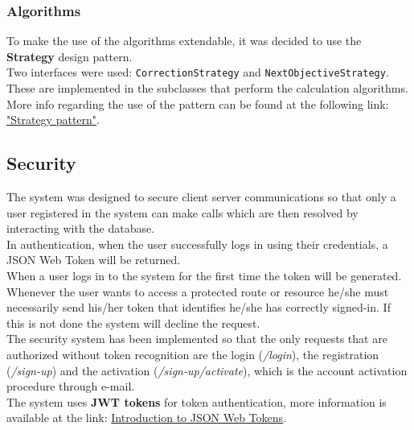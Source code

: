 \subsubsection{Algorithms}
To make the use of the algorithms extendable, it was decided to use the \textbf{Strategy} design pattern.\\
Two interfaces were used: \texttt{CorrectionStrategy} and \texttt{NextObjectiveStrategy}. These are implemented in the subclasses that perform the calculation algorithms.\\
More info regarding the use of the pattern can be found at the following link: \href{https://en.wikipedia.org/wiki/Strategy_pattern}{"Strategy pattern"}.


\subsection{Security}
The system was designed to secure client server communications so that only a user registered in the system can make calls which are then resolved by interacting with the database.\\
In authentication, when the user successfully logs in using their credentials, a JSON Web Token will be returned.\\
When a user logs in to the system for the first time the token will be generated.\\
Whenever the user wants to access a protected route or resource he/she must necessarily send his/her token that identifies he/she has correctly signed-in. If this is not done the system will decline the request.\\
The security system has been implemented so that the only requests that are authorized without token recognition are the login (\textit{/login}), the registration (\textit{/sign-up}) and the activation (\textit{/sign-up/activate}), which is the account activation procedure through e-mail.\\
The system uses \textbf{JWT tokens} for token authentication, more information is available at the link: \href{https://jwt.io/introduction/}{Introduction to JSON Web Tokens}.

